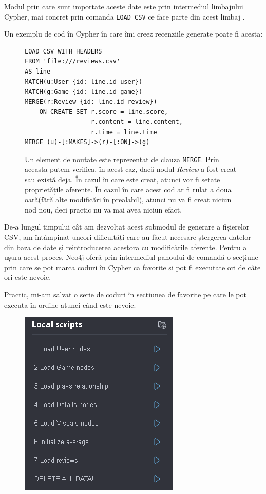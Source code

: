 \documentclass[12pt,a4paper]{report}
\begin{document}
Modul prin care sunt importate aceste date este prin intermediul limbajului Cypher, mai concret prin comanda \texttt{LOAD CSV} ce face parte din acest limbaj \cite{18}.

Un exemplu de cod în Cypher în care îmi creez recenziile generate poate fi acesta:

\begin{figure}[H]
\centering
\begin{BVerbatim}
LOAD CSV WITH HEADERS
FROM 'file:///reviews.csv'
AS line
MATCH(u:User {id: line.id_user})
MATCH(g:Game {id: line.id_game})
MERGE(r:Review {id: line.id_review})
    ON CREATE SET r.score = line.score,
                  r.content = line.content,
                  r.time = line.time
MERGE (u)-[:MAKES]->(r)-[:ON]->(g)
\end{BVerbatim}
\caption*{Un element de noutate este reprezentat de clauza \texttt{MERGE}. Prin aceasta putem verifica, în acest caz, dacă nodul \emph{Review} a fost creat sau există deja. În cazul în care este creat, atunci vor fi setate proprietățile aferente. În cazul în care acest cod ar fi rulat a doua oară(fără alte modificări în prealabil), atunci nu va fi creat niciun nod nou, deci practic nu va mai avea niciun efact.}
\end{figure}

De-a lungul timpului cât am dezvoltat acest submodul de generare a fișierelor CSV, am întâmpinat uneori dificultăți care au făcut necesare ștergerea datelor din baza de date și reintroducerea acestora cu modificările aferente. Pentru a ușura acest proces, Neo4j oferă prin intermediul panoului de comandă o secțiune prin care se pot marca coduri în Cypher ca favorite și pot fi executate ori de câte ori este nevoie.

Practic, mi-am salvat o serie de coduri în secțiunea de favorite pe care le pot executa în ordine atunci când este nevoie. 

\begin{figure}[H]
\centering
\caption{}
\begin{adjustbox}{max size={\textwidth}{\textheight}}
\includegraphics[scale = 0.75]{exemplu_15_favorites}
\end{adjustbox}
\caption*{}
\end{figure}
\end{document}
